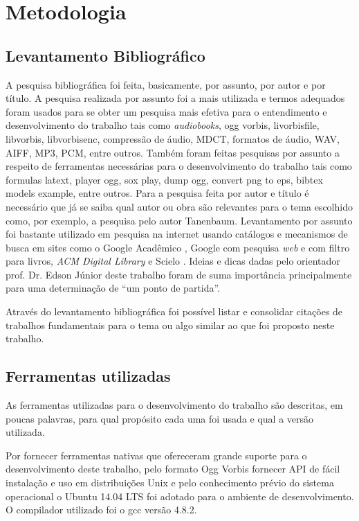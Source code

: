 \chapter[Metodologia]{Metodologia}\label{cap5}

\section{Levantamento Bibliográfico}

A pesquisa bibliográfica foi feita, basicamente, por assunto, por autor e por título. A pesquisa realizada por assunto foi a mais utilizada e termos adequados foram usados para se obter um pesquisa mais efetiva para o entendimento e desenvolvimento do trabalho tais como \textit{audiobooks}, ogg vorbis, livorbisfile, libvorbis, libvorbisenc, compressão de áudio, MDCT, formatos de áudio, WAV, AIFF, MP3, PCM, entre outros. Também foram feitas pesquisas por assunto a respeito de ferramentas necessárias para o desenvolvimento do trabalho tais como formulas latext, player ogg, sox play, dump ogg, convert png to eps, bibtex models example, entre outros. Para a pesquisa feita por autor e título é necessário que já se saiba qual autor ou obra são relevantes para o tema escolhido como, por exemplo, a pesquisa pelo autor Tanenbaum. Levantamento por assunto foi bastante utilizado em pesquisa na internet usando catálogos e mecanismos de busca em sites como o Google Acadêmico \cite{googleacademico}, Google com pesquisa \textit{web} e com filtro para livros, \textit{ACM Digital Library} \cite{acm} e Scielo \cite{scielo}. Ideias e dicas dadas pelo orientador prof. Dr. Edson Júnior deste trabalho foram de suma importância principalmente para uma determinação de ``um ponto de partida''.

Através do levantamento bibliográfica foi possível listar e consolidar citações de trabalhos fundamentais para o tema ou algo similar ao que foi proposto neste trabalho. 

\section{Ferramentas utilizadas}

As ferramentas utilizadas para o desenvolvimento do trabalho são descritas, em poucas palavras, para qual propósito cada uma foi usada e qual a versão utilizada.

Por fornecer ferramentas nativas que ofereceram grande suporte para o desenvolvimento deste trabalho, pelo formato Ogg Vorbis fornecer API de fácil instalação e uso em distribuições Unix e pelo conhecimento prévio do sistema operacional o Ubuntu 14.04 LTS foi adotado para o ambiente de desenvolvimento. O compilador utilizado foi o gcc versão 4.8.2.

